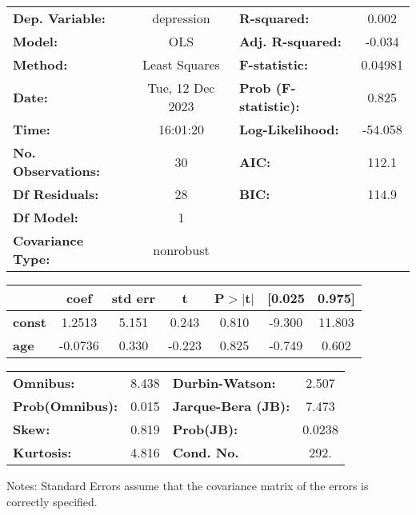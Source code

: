 \begin{center}
\begin{tabular}{lclc}
\toprule
\textbf{Dep. Variable:}    &    depression    & \textbf{  R-squared:         } &     0.002   \\
\textbf{Model:}            &       OLS        & \textbf{  Adj. R-squared:    } &    -0.034   \\
\textbf{Method:}           &  Least Squares   & \textbf{  F-statistic:       } &   0.04981   \\
\textbf{Date:}             & Tue, 12 Dec 2023 & \textbf{  Prob (F-statistic):} &    0.825    \\
\textbf{Time:}             &     16:01:20     & \textbf{  Log-Likelihood:    } &   -54.058   \\
\textbf{No. Observations:} &          30      & \textbf{  AIC:               } &     112.1   \\
\textbf{Df Residuals:}     &          28      & \textbf{  BIC:               } &     114.9   \\
\textbf{Df Model:}         &           1      & \textbf{                     } &             \\
\textbf{Covariance Type:}  &    nonrobust     & \textbf{                     } &             \\
\bottomrule
\end{tabular}
\begin{tabular}{lcccccc}
               & \textbf{coef} & \textbf{std err} & \textbf{t} & \textbf{P$> |$t$|$} & \textbf{[0.025} & \textbf{0.975]}  \\
\midrule
\textbf{const} &       1.2513  &        5.151     &     0.243  &         0.810        &       -9.300    &       11.803     \\
\textbf{age}   &      -0.0736  &        0.330     &    -0.223  &         0.825        &       -0.749    &        0.602     \\
\bottomrule
\end{tabular}
\begin{tabular}{lclc}
\textbf{Omnibus:}       &  8.438 & \textbf{  Durbin-Watson:     } &    2.507  \\
\textbf{Prob(Omnibus):} &  0.015 & \textbf{  Jarque-Bera (JB):  } &    7.473  \\
\textbf{Skew:}          &  0.819 & \textbf{  Prob(JB):          } &   0.0238  \\
\textbf{Kurtosis:}      &  4.816 & \textbf{  Cond. No.          } &     292.  \\
\bottomrule
\end{tabular}
\end{center}

Notes: \newline
 [1] Standard Errors assume that the covariance matrix of the errors is correctly specified.